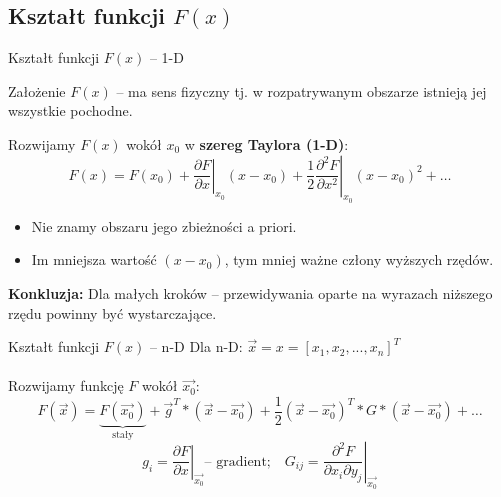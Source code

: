 \subsection{Kształt funkcji $ F(x) $}
  \begin{frame}{Kształt funkcji $ F(x) $ -- 1-D}
    \begin{block}{Założenie}
      $ F(x) $ -- ma sens fizyczny tj. w rozpatrywanym
      obszarze istnieją jej wszystkie pochodne.
    \end{block}
    Rozwijamy $F(x)$ wokół $x_0$ w \textbf{szereg Taylora (1-D)}:
    \begin{displaymath}
      F(x) = F(x_0) + \left. \frac{\partial F}{\partial x} \right|_{x_0}(x - x_0) +
      \left. \frac{1}{2} \frac{\partial^2 F}{\partial x^2} \right|_{x_0}(x - x_0)^2 +
      \dots
    \end{displaymath}
    \begin{itemize}
      \item Nie znamy obszaru jego zbieżności a priori.
      \item Im mniejsza wartość $ (x - x_0) $, tym mniej ważne człony
      wyższych rzędów.
    \end{itemize}
    \textbf{Konkluzja:} Dla małych kroków -- przewidywania oparte
    na wyrazach niższego rzędu powinny być wystarczające.

  \end{frame}

  \begin{frame}{Kształt funkcji $ F(x) $ -- n-D}
    Dla n-D: $ \vec{x} = x = [x_1, x_2, ..., x_n]^T $ \\
    \text{ } \\
    Rozwijamy funkcję $ F $ wokół $ \vec{x_0} $:
    \begin{displaymath}
      F(\vec{x}) = \underbrace{F(\vec{x_0})}_{\text{stały}} +
      \vec{g}^T * (\vec{x} - \vec{x_0}) +
      \frac{1}{2}(\vec{x} - \vec{x_0})^T * G * (\vec{x} - \vec{x_0}) + \dots
    \end{displaymath}
    \begin{displaymath}
      g_i = \left. \frac{\partial F}{\partial x} \right|_{\vec{x_0}} \text{-- gradient;}\quad
      G_{ij} = \left. \frac{\partial^2 F}{\partial x_i \partial y_j} \right|_{\vec{x_0}}
    \end{displaymath}

  \end{frame}

